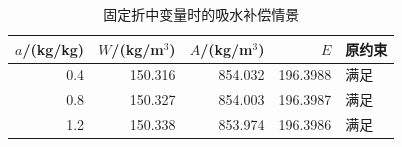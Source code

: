 \begin{table}[htbp]
  \centering
  \caption{固定折中变量时的吸水补偿情景}
  \label{tab:absorption}
  \begin{tabular}{@{}rrrrl@{}}
    \toprule
    $a$/(kg/kg) & $W$/(kg/m$^3$) & $A$/(kg/m$^3$) & $E$ & 原约束\\
    \midrule
    0.4 & 150.316 & 854.032 & 196.3988 & 满足\\
    0.8 & 150.327 & 854.003 & 196.3987 & 满足\\
    1.2 & 150.338 & 853.974 & 196.3986 & 满足\\
    \bottomrule
  \end{tabular}
\end{table}
